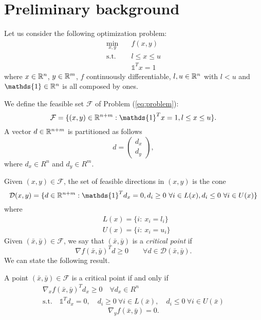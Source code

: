 \section{Preliminary background}
Let us consider the following optimization problem:
\begin{subequations}\label{eq:problem} 
\begin{align}
\min_{x,y} & \quad f(x,y)  \\
\text{s.t.} & \quad l \leq x \leq u \\
& \quad \mathds{1}^T x = 1 
\end{align}
\end{subequations}
where $x \in \mathbb{R}^n$, $y \in \mathbb{R}^m$, $f$ continuously differentiable, $l, u \in \mathbb{R}^n$ with $l < u$ and $\mathds{1} \in \R^n$ is all composed by ones. 

We define the feasible set $\mathcal{F}$  of Problem (\ref{eq:problem}):
\begin{equation}
\mathcal{F} = \{(x,y) \in \R^{n+m} : \mathds{1}^T x = 1, l \leq x \leq u\}.
\end{equation}
A vector $d\in \mathbb{R}^{n+m}$ is partitioned as follows
$$
d=\left(
\begin{array}{c}
d_x\\
d_y
\end{array}
\right ),
$$
where $d_x\in R^n$ and $d_y\in R^m$.

Given $(x,y) \in \mathcal{F}$, the set of feasible directions in $(x,y)$ is the cone
\begin{equation}
 \mathcal{D}(x,y)=\{ d \in \R^{n+m}: \mathds{1}^Td_x=0, d_i\ge 0 \ \forall i \in L(x), d_i\le 0 \ \forall i \in U(x)\}
\end{equation}
where
\begin{equation}
 \begin{aligned}
  &L(x)=\{ i: \ x_i=l_i\}\\
  &U(x)=\{ i: \ x_i=u_i\}
 \end{aligned}
\end{equation}
Given $(\bar x,\bar y) \in \mathcal{F}$, we say that $(\bar x,\bar y)$ is a {\it critical point} if
$$
\nabla f(\bar x,\bar y)^Td\ge 0\quad\quad \forall d\in  \mathcal{D}(\bar x,\bar y).
$$
We can state the following result.
\begin{proposition}\label{optimality}
A point $(\bar x,\bar y) \in \mathcal{F}$ is a critical point if and only if
\begin{equation}\label{on_x}
\begin{aligned}
&\nabla_xf(\bar x,\bar y)^Td_x\ge 0 \quad \forall d_x\in R^n & \\ 
&\text{s.t.} \quad \mathds{1}^Td_x=0,\quad d_i\ge 0 \ \forall i \in L(\bar x), \quad d_i\le 0 \ \forall i \in U(\bar x)&
\end{aligned}
\end{equation}
\begin{equation}\label{on_y}
 \nabla_yf(\bar x,\bar y)=0.
\end{equation} 
\end{proposition}

